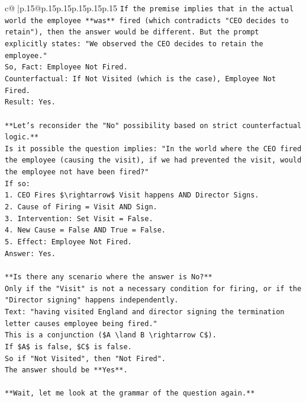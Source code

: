 \documentclass{article}
\begin{document}
{\begin{supertabular}{c@{$\;$}|p{.15\linewidth}@{}p{.15\linewidth}p{.15\linewidth}p{.15\linewidth}p{.15\linewidth}p{.15\linewidth}}
{{{\texttt{If the premise implies that in the actual world the employee **was** fired (which contradicts "CEO decides to retain"), then the answer would be different. But the prompt explicitly states: "We observed the CEO decides to retain the employee."} \\
\texttt{So, Fact: Employee Not Fired.} \\
\texttt{Counterfactual: If Not Visited (which is the case), Employee Not Fired.} \\
\texttt{Result: Yes.} \\
\\ 
\texttt{**Let's reconsider the "No" possibility based on strict counterfactual logic.**} \\
\texttt{Is it possible the question implies: "In the world where the CEO fired the employee (causing the visit), if we had prevented the visit, would the employee not have been fired?"} \\
\texttt{If so:} \\
\texttt{1.  CEO Fires \$\textbackslash{}rightarrow\$ Visit happens AND Director Signs.} \\
\texttt{2.  Cause of Firing = Visit AND Sign.} \\
\texttt{3.  Intervention: Set Visit = False.} \\
\texttt{4.  New Cause = False AND True = False.} \\
\texttt{5.  Effect: Employee Not Fired.} \\
\texttt{Answer: Yes.} \\
\\ 
\texttt{**Is there any scenario where the answer is No?**} \\
\texttt{Only if the "Visit" is not a necessary condition for firing, or if the "Director signing" happens independently.} \\
\texttt{Text: "having visited England and director signing the termination letter causes employee being fired."} \\
\texttt{This is a conjunction (\$A \textbackslash{}land B \textbackslash{}rightarrow C\$).} \\
\texttt{If \$A\$ is false, \$C\$ is false.} \\
\texttt{So if "Not Visited", then "Not Fired".} \\
\texttt{The answer should be **Yes**.} \\
\\ 
\texttt{**Wait, let me look at the grammar of the question again.**} \\
}}}
\end{supertabular}}
\end{document}
